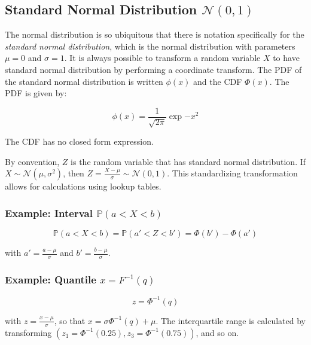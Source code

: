\subsection{Standard Normal Distribution $\mathscr{N}(0,1)$ }

The normal distribution is so ubiquitous that there is notation specifically for the \textit{standard normal distribution}, which is the normal distribution with parameters $\mu = 0$ and $\sigma = 1$. It is always possible to transform a random variable $X$ to have standard normal distribution by performing a coordinate transform. The PDF of the standard normal distribution is written $\phi(x)$ and the CDF $\Phi(x)$. The PDF is given by: 

\begin{equation}
\phi(x) = \frac{1}{\sqrt{2\pi}}\exp{-x^2}
\end{equation}

The CDF has no closed form expression. 

By convention, $Z$ is the random variable that has standard normal distribution. If $X \sim \mathscr{N}(\mu,\sigma^2)$, then $Z = \frac{X-\mu}{\sigma} \sim \mathscr{N}(0,1)$. This standardizing transformation allows for calculations using lookup tables. 

\subsubsection{Example: Interval $\mathbb{P}(a<X<b)$}

\begin{equation}
\mathbb{P}(a<X<b) =  \mathbb{P}(a' < Z < b') = \Phi(b') - \Phi(a')
\end{equation}

with $a' = \frac{a-\mu}{\sigma}$ and $b' = \frac{b-\mu}{\sigma}$.

\subsubsection{Example: Quantile $x = F^{-1}(q)$}

\begin{equation}
z = \Phi^{-1}(q)
\end{equation}

with $z = \frac{x-\mu}{\sigma}$, so that $x = \sigma \Phi^{-1}(q)+\mu$. The interquartile range is calculated by transforming $(z_{1}=\Phi^{-1}(0.25),z_{3}=\Phi^{-1}(0.75))$, and so on.


